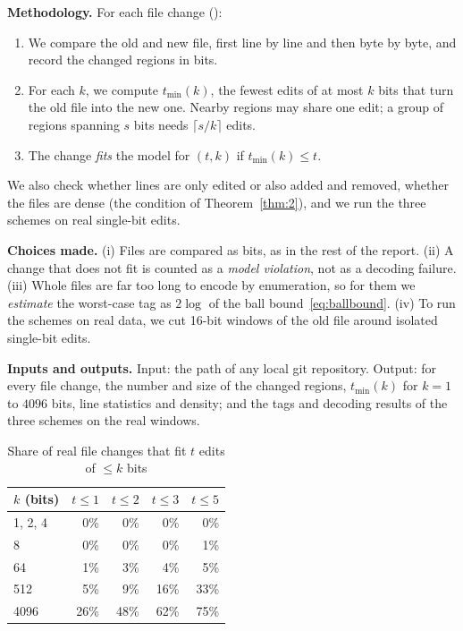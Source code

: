 \documentclass[journal,10pt]{IEEEtran}
\begin{document}
\textbf{Methodology.} For each file change ():
\begin{enumerate}
\item We compare the old and new file, first line by line and then byte by byte, and record the changed regions in bits.
\item For each $k$, we compute $t_{\min}(k)$, the fewest edits of at most $k$ bits that turn the old file into the new one. Nearby regions may share one edit; a group of regions spanning $s$ bits needs $\lceil s/k\rceil$ edits.
\item The change \emph{fits} the model for $(t,k)$ if $t_{\min}(k)\le t$.
\end{enumerate}
We also check whether lines are only edited or also added and removed, whether the files are dense (the condition of Theorem~\ref{thm:2}), and we run the three schemes on real single-bit edits.

\textbf{Choices made.} (i) Files are compared as bits, as in the rest of the report. (ii) A change that does not fit is counted as a \emph{model violation}, not as a decoding failure. (iii) Whole files are far too long to encode by enumeration, so for them we \emph{estimate} the worst-case tag as $2\log$ of the ball bound~\eqref{eq:ballbound}. (iv) To run the schemes on real data, we cut 16-bit windows of the old file around isolated single-bit edits.

\textbf{Inputs and outputs.} Input: the path of any local git repository. Output: for every file change, the number and size of the changed regions, $t_{\min}(k)$ for $k=1$ to $4096$ bits, line statistics and density; and the tags and decoding results of the three schemes on the real windows.

\begin{table}[!t]
\caption{Share of real file changes that fit $t$ edits of $\le k$ bits}\label{tab:fit}
\centering\footnotesize
\begin{tabular}{@{}lrrrr@{}}
\toprule
$k$ (bits) & $t\le1$ & $t\le2$ & $t\le3$ & $t\le5$\\
\midrule
1, 2, 4 & 0\% & 0\% & 0\% & 0\%\\
8 & 0\% & 0\% & 0\% & 1\%\\
64 & 1\% & 3\% & 4\% & 5\%\\
512 & 5\% & 9\% & 16\% & 33\%\\
4096 & 26\% & 48\% & 62\% & 75\%\\
\bottomrule
\end{tabular}
\end{table}
\end{document}
